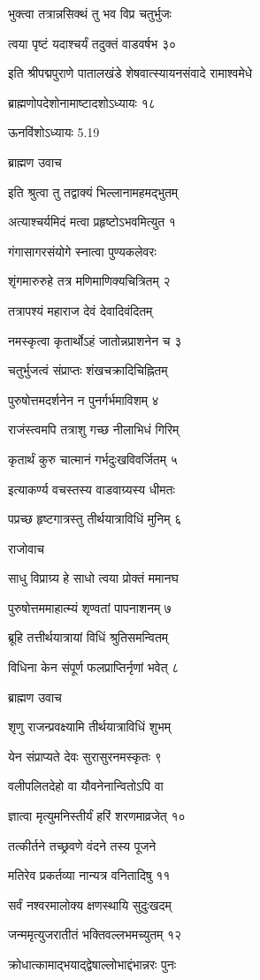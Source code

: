 भुक्त्वा तत्रान्नसिक्थं तु भव विप्र चतुर्भुजः

त्वया पृष्टं यदाश्चर्यं तदुक्तं वाडवर्षभ ३०

इति श्रीपद्मपुराणे पातालखंडे शेषवात्स्यायनसंवादे रामाश्वमेधे

ब्राह्मणोपदेशोनामाष्टादशोऽध्यायः १८

ऊनविंशोऽध्यायः 5.19

ब्राह्मण उवाच

इति श्रुत्वा तु तद्वाक्यं भिल्लानामहमद्भुतम्

अत्याश्चर्यमिदं मत्वा प्रहृष्टोऽभवमित्युत १

गंगासागरसंयोगे स्नात्वा पुण्यकलेवरः

शृंगमारुरुहे तत्र मणिमाणिक्यचित्रितम् २

तत्रापश्यं महाराज देवं देवादिवंदितम्

नमस्कृत्वा कृतार्थोऽहं जातोन्नप्राशनेन च ३

चतुर्भुजत्वं संप्राप्तः शंखचक्रादिचिह्नितम्

पुरुषोत्तमदर्शनेन न पुनर्गर्भमाविशम् ४

राजंस्त्वमपि तत्राशु गच्छ नीलाभिधं गिरिम्

कृतार्थं कुरु चात्मानं गर्भदुःखविवर्जितम् ५

इत्याकर्ण्य वचस्तस्य वाडवाग्र्यस्य धीमतः

पप्रच्छ हृष्टगात्रस्तु तीर्थयात्राविधिं मुनिम् ६

राजोवाच

साधु विप्राग्र्य हे साधो त्वया प्रोक्तं ममानघ

पुरुषोत्तममाहात्म्यं शृण्वतां पापनाशनम् ७

ब्रूहि तत्तीर्थयात्रायां विधिं श्रुतिसमन्वितम्

विधिना केन संपूर्ण फलप्राप्तिर्नृणां भवेत् ८

ब्राह्मण उवाच

शृणु राजन्प्रवक्ष्यामि तीर्थयात्राविधिं शुभम्

येन संप्राप्यते देवः सुरासुरनमस्कृतः ९

वलीपलितदेहो वा यौवनेनान्वितोऽपि वा

ज्ञात्वा मृत्युमनिस्तीर्यं हरिं शरणमाव्रजेत् १०

तत्कीर्तने तच्छ्रवणे वंदने तस्य पूजने

मतिरेव प्रकर्तव्या नान्यत्र वनितादिषु ११

सर्वं नश्वरमालोक्य क्षणस्थायि सुदुःखदम्

जन्ममृत्युजरातीतं भक्तिवल्लभमच्युतम् १२

क्रोधात्कामाद्भयाद्द्वेषाल्लोभाद्दंभान्नरः पुनः

